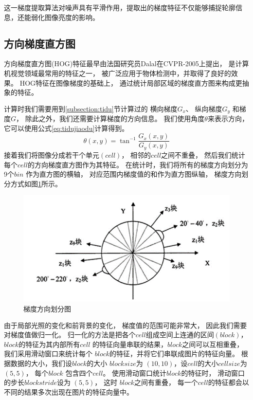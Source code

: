 这一梯度提取算法对噪声具有平滑作用，提取出的梯度特征不仅能够捕捉轮廓信息，还能弱化图像亮度的影响。

\subsection{方向梯度直方图}\label{subsection:tiquzhifangtu}

方向梯度直方图\cite{dalal2005histograms}(HOG)特征最早由法国研究员Dalal在CVPR-2005上提出，
是计算机视觉领域最常用的特征之一，
被广泛应用于物体检测中，并取得了良好的效果。
HOG特征在图像梯度的基础上，
通过统计局部区域的梯度直方图来构成更抽象的特征。

计算时我们需要用到\ref{subsection:tidu}节计算过的
横向梯度$G_x$、
纵向梯度$G_y$
和梯度$G$，
除此之外，我们还需要计算梯度的方向信息。
我们使用角度$\theta$来表示方向，
它可以使用公式\eqref{eq:tidujiaodu}计算得到。
\begin{equation}
\label{eq:tidujiaodu}
\theta (x,y)={\tan^{-1}{\frac{G_x(x,y)}{G_y(x,y)}}}
\end{equation}
接着我们将图像分成若干个单元$(cell)$，
相邻的$cell$之间不重叠，
然后我们统计每个$cell$的方向梯度直方图作为其特征。
在统计时，我们将所有的梯度方向划分为9个$bin$
作为直方图的横轴，
对应范围内梯度值的和作为直方图纵轴，
梯度方向划分方式如图\ref{fig:tiduhuafentu}所示。
\begin{figure}[htbp]
\centering
\includegraphics[width=1.0\linewidth]{figures/gradient.png}
\caption{梯度方向划分图}
\label{fig:tiduhuafentu}
\end{figure}
由于局部光照的变化和前背景的变化，
梯度值的范围可能非常大，
因此我们需要对梯度值做归一化。
归一化的方法是把各个$cell$组成空间上连通的区间$(block)$，
$block$的特征为其内部所有$cell$
的特征向量串联的结果，$block$之间可以互相重叠，我们采用滑动窗口来统计每个
$block$的特征，并将它们串联成图片的特征向量。
根据数据的大小，我们设$block$的大小
$blocksize$为
$(10,10)$，设$cell$的大小$cellsize$为
$(5,5)$，
每个$block$
包含四个$cell$。
使用滑动窗口统计$block$的特征时，
滑动窗口的步长$blockstride$设为
$(5,5)$，
这时
$block$之间有重叠，
每一个$cell$的特征都会以不同的结果多次出现在图片的特征向量中。

